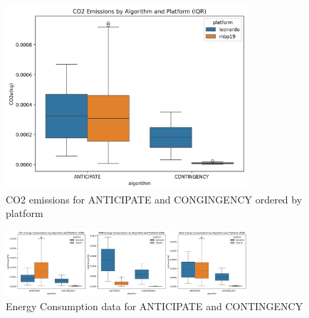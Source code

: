 \documentclass[a4paper,singleside,12pt]{report} %
\begin{document}
\begin{figure}[h!]
    \centering
    \includegraphics[width=0.8\textwidth]{imgs/CO2_emissions_no_outliers.png}
    \caption{CO2 emissions for ANTICIPATE and CONGINGENCY ordered by platform}
    \label{fig:ant_cont_co2_emissions}
\end{figure}

\begin{figure}[h!]
    \centering
    \includegraphics[width=0.8\textwidth]{imgs/energy_consumption_no_outliers.png}
    \caption{Energy Consumption data for ANTICIPATE and CONTINGENCY}
    \label{fig:ant_cont_energy}
\end{figure}
\end{document}
